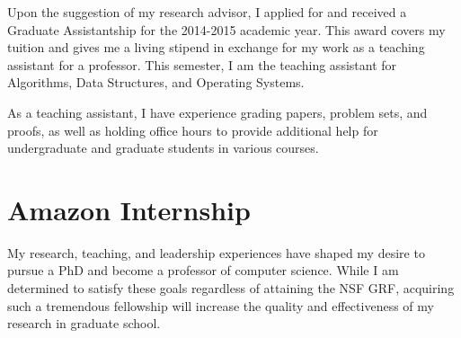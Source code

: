 \documentclass[12pt]{article}
\begin{document}
Upon the suggestion of my research advisor, I applied for and received a Graduate Assistantship for the 2014-2015 academic year. This award covers my tuition and gives me a living stipend in exchange for my work as a teaching assistant for a professor. This semester, I am the teaching assistant for Algorithms, Data Structures, and Operating Systems.

As a teaching assistant, I have experience grading papers, problem sets, and proofs, as well as holding office hours to provide additional help for undergraduate and graduate students in various courses. 

\section*{Amazon Internship}



My research, teaching, and leadership experiences have shaped my desire to pursue a PhD and become a professor of computer science. While I am determined to satisfy these goals regardless of attaining the NSF GRF, acquiring such a tremendous fellowship will increase the quality and effectiveness of my research in graduate school.
\end{document}
